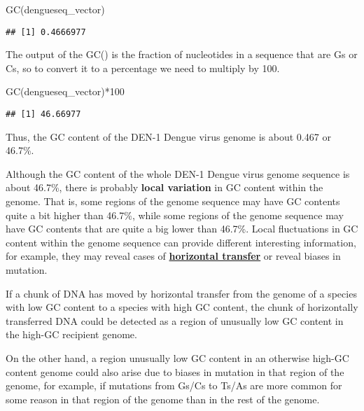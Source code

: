 \documentclass[
]{book}
\newenvironment{Shaded}{\begin{snugshade}}{\end{snugshade}}
\newcommand{\DecValTok}[1]{\textcolor[rgb]{0.00,0.00,0.81}{#1}}
\newcommand{\FunctionTok}[1]{\textcolor[rgb]{0.00,0.00,0.00}{#1}}
\newcommand{\NormalTok}[1]{#1}
\newcommand{\SpecialCharTok}[1]{\textcolor[rgb]{0.00,0.00,0.00}{#1}}
\begin{document}
\begin{Shaded}
\begin{Highlighting}[]
\FunctionTok{GC}\NormalTok{(dengueseq\_vector)}
\end{Highlighting}
\end{Shaded}

\begin{verbatim}
## [1] 0.4666977
\end{verbatim}

The output of the GC() is the fraction of nucleotides in a sequence that are Gs or Cs, so to convert it to a percentage we need to multiply by 100.

\begin{Shaded}
\begin{Highlighting}[]
\FunctionTok{GC}\NormalTok{(dengueseq\_vector)}\SpecialCharTok{*}\DecValTok{100}
\end{Highlighting}
\end{Shaded}

\begin{verbatim}
## [1] 46.66977
\end{verbatim}

Thus, the GC content of the DEN-1 Dengue virus genome is about 0.467 or 46.7\%.

Although the GC content of the whole DEN-1 Dengue virus genome sequence is about 46.7\%, there is probably \textbf{local variation} in GC content within the genome. That is, some regions of the genome sequence may have GC contents quite a bit higher than 46.7\%, while some regions of the genome sequence may have GC contents that are quite a big lower than 46.7\%. Local fluctuations in GC content within the genome sequence can provide different interesting information, for example, they may reveal cases of \href{en.wikipedia.org/wiki/Horizontal_gene_transfer}{\textbf{horizontal transfer}} or reveal biases in mutation.

If a chunk of DNA has moved by horizontal transfer from the genome of a species with low GC content to a species with high GC content, the chunk of horizontally transferred DNA could be detected as a region of unusually low GC content in the high-GC recipient genome.

On the other hand, a region unusually low GC content in an otherwise high-GC content genome could also arise due to biases in mutation in that region of the genome, for example, if mutations from Gs/Cs to Ts/As are more common for some reason in that region of the genome than in the rest of the genome.
\end{document}
